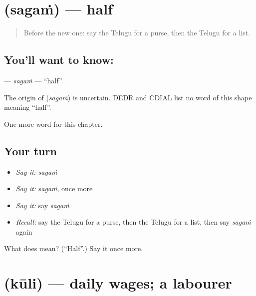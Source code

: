 \section[\texorpdfstring{\te{సగం} (sagaṁ)}{సగం (sagaṁ)}]{ (sagaṁ) — half}

\label{lesson:TE-C310-sagam}



\begin{quote}
Before the new one: say the Telugu for a purse, then the Telugu for a list.
\end{quote}

\subsection*{You'll want to know: }
\textbf{} — \emph{sagaṁ} — \textquotedblleft{}half\textquotedblright{}.

\begin{cousinweb}
The origin of \textbf{} (\emph{sagaṁ}) is uncertain. DEDR and CDIAL list no word of this shape meaning \textquotedblleft{}half\textquotedblright{}.
\end{cousinweb}

\begin{grammarlens}[title={What you've built}]
One more word for this chapter.
\end{grammarlens}

\subsection*{Your turn}
\begin{itemize}
\raggedright
  \item \emph{Say it:} \emph{sagaṁ}
  \item \emph{Say it:} \emph{sagaṁ}, once more
  \item \emph{Say it:} say \emph{sagaṁ}
  \item \emph{Recall:} say the Telugu for a purse, then the Telugu for a list, then say \emph{sagaṁ} again
\end{itemize}

\begin{tcolorbox}[breakable,colback=teal!4,colframe=teal!35!black,title={Before you move on}]
What does  mean? (\textquotedblleft{}Half\textquotedblright{}.) Say it once more.
\end{tcolorbox}
\section[\texorpdfstring{\te{కూలి} (kūli)}{కూలి (kūli)}]{ (kūli) — daily wages; a labourer}

